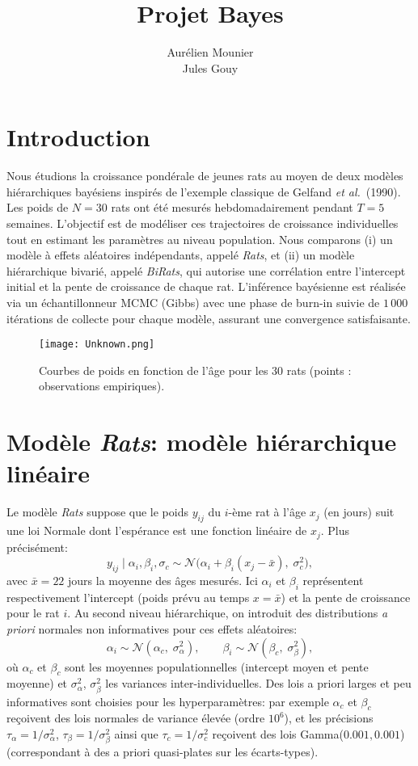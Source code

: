 \documentclass[12pt]{article}
\title{\textbf{Projet Bayes}}
\author{Aur\'elien Mounier \\ Jules Gouy}
\date{}
\begin{document}
\maketitle
\section*{Introduction}
Nous étudions la croissance pondérale de jeunes rats au moyen de deux modèles hiérarchiques bayésiens inspirés de l'exemple classique de Gelfand \textit{et al.}\ (1990). Les poids de $N=30$ rats ont été mesurés hebdomadairement pendant $T=5$ semaines. L'objectif est de modéliser ces trajectoires de croissance individuelles tout en estimant les paramètres au niveau population. Nous comparons (i) un modèle à effets aléatoires indépendants, appelé \textit{Rats}, et (ii) un modèle hiérarchique bivarié, appelé \textit{BiRats}, qui autorise une corrélation entre l'intercept initial et la pente de croissance de chaque rat. L'inférence bayésienne est réalisée via un échantillonneur MCMC (Gibbs) avec une phase de burn-in suivie de $1\,000$ itérations de collecte pour chaque modèle, assurant une convergence satisfaisante.

\begin{figure}[htb]
    \centering
    \texttt{[image: Unknown.png]}
    \caption{Courbes de poids en fonction de l'âge pour les 30 rats (points : observations empiriques).}
    \label{fig:data}
\end{figure}

\section{Modèle \textit{Rats}: modèle hiérarchique linéaire}
Le modèle \textit{Rats} suppose que le poids $y_{ij}$ du $i$-ème rat à l'âge $x_j$ (en jours) suit une loi Normale dont l'espérance est une fonction linéaire de $x_j$. Plus précisément:
\[
y_{ij} \mid \alpha_i,\beta_i,\sigma_c \sim \mathcal{N}\!\big(\alpha_i + \beta_i(x_j - \bar{x}),\;\sigma_c^2\big),
\] 
avec $\bar{x}=22$ jours la moyenne des âges mesurés. Ici $\alpha_i$ et $\beta_i$ représentent respectivement l'intercept (poids prévu au temps $x=\bar{x}$) et la pente de croissance pour le rat $i$. Au second niveau hiérarchique, on introduit des distributions \emph{a priori} normales non informatives pour ces effets aléatoires:
\[
\alpha_i \sim \mathcal{N}(\alpha_c,\;\sigma_{\alpha}^2), \qquad 
\beta_i \sim \mathcal{N}(\beta_c,\;\sigma_{\beta}^2),
\] 
où $\alpha_c$ et $\beta_c$ sont les moyennes populationnelles (intercept moyen et pente moyenne) et $\sigma_{\alpha}^2$, $\sigma_{\beta}^2$ les variances inter-individuelles. Des lois a priori larges et peu informatives sont choisies pour les hyperparamètres: par exemple $\alpha_c$ et $\beta_c$ reçoivent des lois normales de variance élevée (ordre $10^6$), et les précisions $\tau_{\alpha}=1/\sigma_{\alpha}^2$, $\tau_{\beta}=1/\sigma_{\beta}^2$ ainsi que $\tau_c=1/\sigma_c^2$ reçoivent des lois Gamma($0.001,0.001$) (correspondant à des a priori quasi-plates sur les écarts-types).
\end{document}
